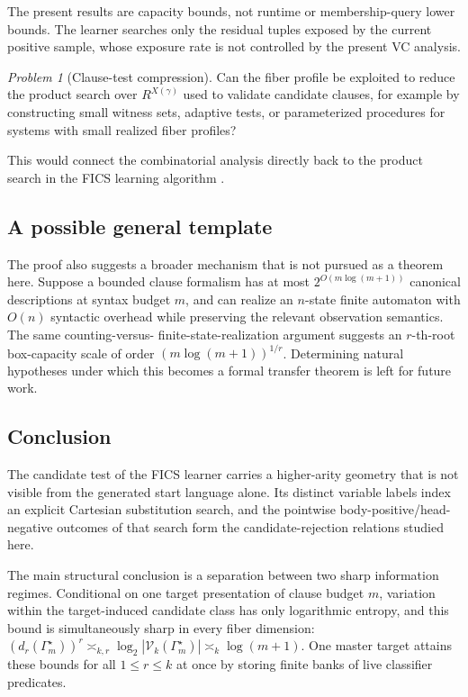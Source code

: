 \documentclass[11pt]{article}
\theoremstyle{definition}
\theoremstyle{remark}
\newtheorem{problem}[theorem]{Problem}
\begin{document}
The present results are capacity bounds, not runtime or membership-query lower bounds.  The learner searches only the residual tuples exposed by the current positive sample, whose exposure rate is not controlled by the present VC analysis.

\begin{problem}[Clause-test compression]
Can the fiber profile be exploited to reduce the product search over
\(R^{X(\gamma)}\)
used to validate candidate clauses, for example by
constructing small witness sets, adaptive tests, or parameterized procedures
for systems with small realized fiber profiles?
\end{problem}

This would connect the combinatorial analysis directly back to the product
search in the FICS learning algorithm \cite{ShoudaiEtAl2026}.

\subsection{A possible general template}

The proof also suggests a broader mechanism that is not pursued as a theorem
here. Suppose a bounded clause formalism has at most
\(2^{O(m\log(m+1))}\) canonical descriptions at syntax budget \(m\), and can
realize an \(n\)-state finite automaton with \(O(n)\) syntactic overhead while
preserving the relevant observation semantics. The same counting-versus-
finite-state-realization argument suggests an \(r\)-th-root box-capacity scale
of order \((m\log(m+1))^{1/r}\). Determining natural hypotheses under which this
becomes a formal transfer theorem is left for future work.

\subsection{Conclusion}

The candidate test of the FICS learner carries a higher-arity geometry that is
not visible from the generated start language alone.  Its distinct variable
labels index an explicit Cartesian substitution search, and the pointwise
body-positive/head-negative outcomes of that search form the
candidate-rejection relations studied here.

The main structural conclusion is a separation between two sharp information
regimes.  Conditional on one target presentation of clause budget \(m\),
variation within the target-induced candidate class has only logarithmic
entropy, and this bound is simultaneously sharp in every fiber dimension:
\((d_r(\Gamma_m^\star))^r \asymp_{k,r} \log_2|\mathcal V_k(\Gamma_m^\star)| \asymp_k \log(m+1).\)
One master target attains these bounds for all \(1\le r\le k\) at once by
storing finite banks of live classifier predicates.
\end{document}

